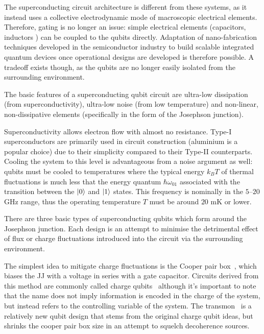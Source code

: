 The superconducting circuit architecture is different from these systems, as it instead uses a collective electrodynamic mode of macroscopic electrical elements.
Therefore, gating is no longer an issue: simple electrical elements (capacitors, inductors \etc) can be coupled to the qubits directly.
Adaptation of nano-fabrication techniques developed in the semiconductor industry to build scalable integrated quantum devices once operational designs are developed is therefore possible.
A tradeoff exists though, as the qubits are no longer easily isolated from the surrounding environment.

The basic features of a superconducting qubit circuit are ultra-low dissipation (from superconductivity), ultra-low noise (from low temperature) and non-linear, non-dissipative elements (specifically in the form of the Josephson junction).

Superconductivity allows electron flow with almost no resistance.
Type-I superconductors are primarily used in circuit construction (aluminium is a popular choice) due to their simplicity compared to their Type-II counterparts.
Cooling the system to this level is advantageous from a noise argument as well: qubits must be cooled to temperatures where the typical energy $k_B T$ of thermal fluctuations is much less that the energy quantum $\hbar \omega_{01}$ associated with the transition between the $\lvert0\rangle$ and $\lvert1\rangle$ states.
This frequency is nominally in the $5$--$20$ GHz range, thus the operating temperature $T$ must be around $20$ mK or lower.

There are three basic types of superconducting qubits which form around the Josephson junction.
Each design is an attempt to minimise the detrimental effect of flux or charge fluctuations introduced into the circuit via the surrounding environment.

The simplest idea to mitigate charge fluctuations is the Cooper pair box~\cite{Nakamura1999,Bouchiat1998}, which biases the JJ with a voltage in series with a gate capacitor.
Circuits derived from this method are commonly called charge qubits~\cite{Makhlin2001,Vion2002} although it's important to note that the name does not imply information is encoded in the charge of the system, but instead refers to the controlling variable of the system.
The transmon~\cite{Wallraff2004, Schreier2008} is a relatively new qubit design that stems from the original charge qubit ideas, but shrinks the cooper pair box size in an attempt to squelch decoherence sources.

